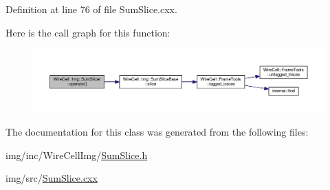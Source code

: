 Definition at line 76 of file Sum\+Slice.\+cxx.

Here is the call graph for this function\+:
\nopagebreak
\begin{figure}[H]
\begin{center}
\leavevmode
\includegraphics[width=350pt]{class_wire_cell_1_1_img_1_1_sum_slicer_aace8b802844078b3d58f1fcff9c30ebd_cgraph}
\end{center}
\end{figure}


The documentation for this class was generated from the following files\+:\begin{DoxyCompactItemize}
\item 
img/inc/\+Wire\+Cell\+Img/\hyperlink{_sum_slice_8h}{Sum\+Slice.\+h}\item 
img/src/\hyperlink{_sum_slice_8cxx}{Sum\+Slice.\+cxx}\end{DoxyCompactItemize}
